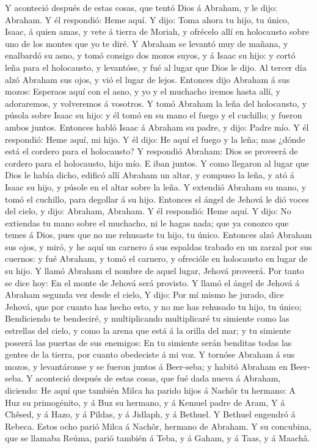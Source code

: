  Y aconteció después de estas cosas, que tentó Dios á
Abraham, y le dijo: Abraham. Y él respondió: Heme aquí.  Y
dijo: Toma ahora tu hijo, tu único, Isaac, á quien amas, y vete á tierra
de Moriah, y ofrécelo allí en holocausto sobre uno de los montes que yo
te diré.  Y Abraham se levantó muy de mañana, y enalbardó
su asno, y tomó consigo dos mozos suyos, y á Isaac su hijo: y cortó leña
para el holocausto, y levantóse, y fué al lugar que Dios le dijo.
 Al tercer día alzó Abraham sus ojos, y vió el lugar de
lejos.  Entonces dijo Abraham á sus mozos: Esperaos aquí
con el asno, y yo y el muchacho iremos hasta allí, y adoraremos, y
volveremos á vosotros.  Y tomó Abraham la leña del
holocausto, y púsola sobre Isaac su hijo: y él tomó en su mano el fuego
y el cuchillo; y fueron ambos juntos.  Entonces habló
Isaac á Abraham su padre, y dijo: Padre mío. Y él respondió: Heme aquí,
mi hijo. Y él dijo: He aquí el fuego y la leña; mas ¿dónde está el
cordero para el holocausto?  Y respondió Abraham: Dios se
proveerá de cordero para el holocausto, hijo mío. E iban juntos.
 Y como llegaron al lugar que Dios le había dicho, edificó
allí Abraham un altar, y compuso la leña, y ató á Isaac su hijo, y
púsole en el altar sobre la leña.  Y extendió Abraham su
mano, y tomó el cuchillo, para degollar á su hijo. 
Entonces el ángel de Jehová le dió voces del cielo, y dijo: Abraham,
Abraham. Y él respondió: Heme aquí.  Y dijo: No extiendas
tu mano sobre el muchacho, ni le hagas nada; que ya conozco que temes á
Dios, pues que no me rehusaste tu hijo, tu único. 
Entonces alzó Abraham sus ojos, y miró, y he aquí un carnero á sus
espaldas trabado en un zarzal por sus cuernos: y fué Abraham, y tomó el
carnero, y ofrecióle en holocausto en lugar de su hijo. 
Y llamó Abraham el nombre de aquel lugar, Jehová proveerá. Por tanto se
dice hoy: En el monte de Jehová será provisto.  Y llamó
el ángel de Jehová á Abraham segunda vez desde el cielo, 
Y dijo: Por mí mismo he jurado, dice Jehová, que por cuanto has hecho
esto, y no me has rehusado tu hijo, tu único; 
Bendiciendo te bendeciré, y multiplicando multiplicaré tu simiente como
las estrellas del cielo, y como la arena que está á la orilla del mar; y
tu simiente poseerá las puertas de sus enemigos:  En tu
simiente serán benditas todas las gentes de la tierra, por cuanto
obedeciste á mi voz.  Y tornóse Abraham á sus mozos, y
levantáronse y se fueron juntos á Beer-seba; y habitó Abraham en
Beer-seba.  Y aconteció después de estas cosas, que fué
dada nueva á Abraham, diciendo: He aquí que también Milca ha parido
hijos á Nachôr tu hermano:  A Huz su primogénito, y á Buz
su hermano, y á Kemuel padre de Aram,  Y á Chêsed, y á
Hazo, y á Pildas, y á Jidlaph, y á Bethuel.  Y Bethuel
engendró á Rebeca. Estos ocho parió Milca á Nachôr, hermano de Abraham.
 Y su concubina, que se llamaba Reúma, parió también á
Teba, y á Gaham, y á Taas, y á Maachâ.

